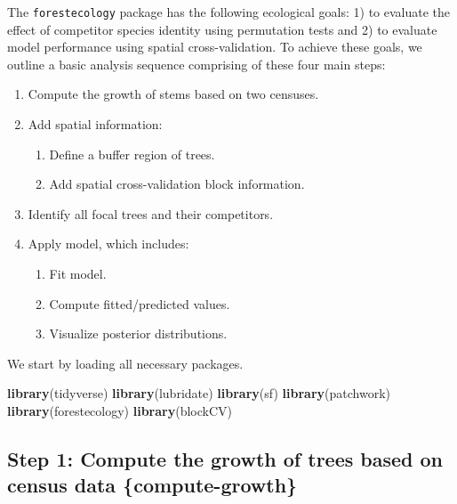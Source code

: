 \documentclass[12pt]{article}
\providecommand{\tightlist}{%
  \setlength{\itemsep}{0pt}\setlength{\parskip}{0pt}}
\newenvironment{Shaded}{\begin{snugshade}}{\end{snugshade}}
\newcommand{\KeywordTok}[1]{\textcolor[rgb]{0.13,0.29,0.53}{\textbf{#1}}}
\newcommand{\NormalTok}[1]{#1}
\begin{document}
The \texttt{forestecology} package has the following ecological goals:
1) to evaluate the effect of competitor species identity using
permutation tests and 2) to evaluate model performance using spatial
cross-validation. To achieve these goals, we outline a basic analysis
sequence comprising of these four main steps:

\begin{enumerate}
\def\labelenumi{\arabic{enumi}.}
\tightlist
\item
  Compute the growth of stems based on two censuses.
\item
  Add spatial information:

  \begin{enumerate}
  \def\labelenumii{\arabic{enumii}.}
  \tightlist
  \item
    Define a buffer region of trees.
  \item
    Add spatial cross-validation block information.
  \end{enumerate}
\item
  Identify all focal trees and their competitors.
\item
  Apply model, which includes:

  \begin{enumerate}
  \def\labelenumii{\arabic{enumii}.}
  \tightlist
  \item
    Fit model.
  \item
    Compute fitted/predicted values.
  \item
    Visualize posterior distributions.
  \end{enumerate}
\end{enumerate}

We start by loading all necessary packages.

\begin{Shaded}
\begin{Highlighting}[]
\KeywordTok{library}\NormalTok{(tidyverse)}
\KeywordTok{library}\NormalTok{(lubridate)}
\KeywordTok{library}\NormalTok{(sf)}
\KeywordTok{library}\NormalTok{(patchwork)}
\KeywordTok{library}\NormalTok{(forestecology)}
\KeywordTok{library}\NormalTok{(blockCV)}
\end{Highlighting}
\end{Shaded}

\hypertarget{step-1-compute-the-growth-of-trees-based-on-census-data-compute-growth}{%
\subsection{Step 1: Compute the growth of trees based on census data
\{compute-growth\}}\label{step-1-compute-the-growth-of-trees-based-on-census-data-compute-growth}}
\end{document}
